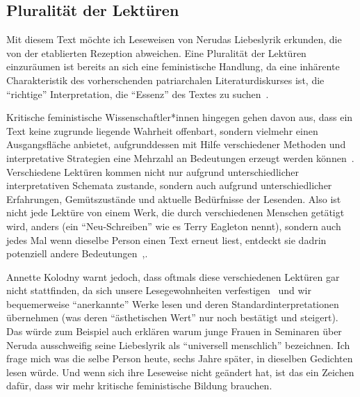 \subsection{Pluralität der Lektüren}

Mit diesem Text möchte ich Leseweisen von Nerudas Liebeslyrik erkunden, die von der etablierten Rezeption abweichen.
Eine Pluralität der Lektüren einzuräumen ist bereits an sich eine feministische Handlung,
da eine inhärente Charakteristik des vorherschenden patriarchalen Literaturdiskurses ist, die ``richtige'' Interpretation, die ``Essenz'' des Textes zu suchen~\cite{Kolodny1980}.

Kritische feministische Wissenschaftler*innen hingegen gehen davon aus, dass ein Text keine zugrunde liegende Wahrheit offenbart, sondern vielmehr einen Ausgangsfläche anbietet, aufgrunddessen mit Hilfe verschiedener Methoden und interpretative Strategien eine Mehrzahl an Bedeutungen erzeugt werden können~\cite{Beehler1988}.
Verschiedene Lektüren kommen nicht nur aufgrund unterschiedlicher interpretativen Schemata zustande, sondern auch aufgrund unterschiedlicher Erfahrungen, Gemütszustände und aktuelle Bedürfnisse der Lesenden.
Also ist nicht jede Lektüre von einem Werk, die durch verschiedenen Menschen getätigt wird, anders (ein ``Neu-Schreiben'' wie es Terry Eagleton nennt), sondern auch jedes Mal wenn dieselbe Person einen Text erneut liest, entdeckt sie dadrin potenziell andere Bedeutungen~\cite{Eagleton1997},\cite{Kolodny1980}.

Annette Kolodny warnt jedoch, dass oftmals diese verschiedenen Lektüren gar nicht stattfinden, da sich unsere Lesegewohnheiten verfestigen~\cite{Kolodny1980} und wir bequemerweise ``anerkannte'' Werke lesen und deren Standardinterpretationen übernehmen (was deren ``ästhetischen Wert'' nur noch bestätigt und steigert).
Das würde zum Beispiel auch erklären warum junge Frauen in Seminaren über Neruda ausschweifig seine Liebeslyrik als ``universell menschlich'' bezeichnen.
Ich frage mich was die selbe Person heute, sechs Jahre später, in dieselben Gedichten lesen würde.
Und wenn sich ihre Leseweise nicht geändert hat, ist das ein Zeichen dafür, dass wir mehr kritische feministische Bildung brauchen.

